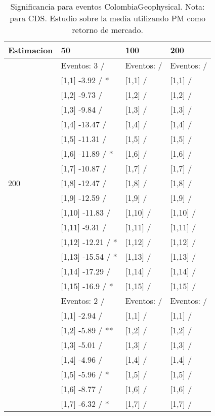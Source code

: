\begin{table}

\caption{Significancia para eventos ColombiaGeophysical. Nota: para CDS. Estudio sobre la media utilizando PM como retorno de mercado.}
\centering
\begin{tabular}[t]{llll}
\toprule
Estimacion & 50 & 100 & 200\\
\midrule
 & Eventos:  3 / & Eventos:   / & Eventos:   /\\
 & {}[1,1] -3.92  / * & {}[1,1]  / & {}[1,1]  /\\
 & {}[1,2] -9.73  / & {}[1,2]  / & {}[1,2]  /\\
 & {}[1,3] -9.84  / & {}[1,3]  / & {}[1,3]  /\\
 & {}[1,4] -13.47  / & {}[1,4]  / & {}[1,4]  /\\
\addlinespace
 & {}[1,5] -11.31  / & {}[1,5]  / & {}[1,5]  /\\
 & {}[1,6] -11.89  / * & {}[1,6]  / & {}[1,6]  /\\
 & {}[1,7] -10.87  / & {}[1,7]  / & {}[1,7]  /\\
200 & {}[1,8] -12.47  / & {}[1,8]  / & {}[1,8]  /\\
 & {}[1,9] -12.59  / & {}[1,9]  / & {}[1,9]  /\\
\addlinespace
 & {}[1,10] -11.83  / & {}[1,10]  / & {}[1,10]  /\\
 & {}[1,11] -9.31  / & {}[1,11]  / & {}[1,11]  /\\
 & {}[1,12] -12.21  / * & {}[1,12]  / & {}[1,12]  /\\
 & {}[1,13] -15.54  / * & {}[1,13]  / & {}[1,13]  /\\
 & {}[1,14] -17.29  / & {}[1,14]  / & {}[1,14]  /\\
\addlinespace
 & {}[1,15] -16.9  / * & {}[1,15]  / & {}[1,15]  /\\
 & Eventos:  2 / & Eventos:   / & Eventos:   /\\
 & {}[1,1] -2.94  / & {}[1,1]  / & {}[1,1]  /\\
 & {}[1,2] -5.89  / ** & {}[1,2]  / & {}[1,2]  /\\
 & {}[1,3] -5.01  / & {}[1,3]  / & {}[1,3]  /\\
\addlinespace
 & {}[1,4] -4.96  / & {}[1,4]  / & {}[1,4]  /\\
 & {}[1,5] -5.96  / * & {}[1,5]  / & {}[1,5]  /\\
 & {}[1,6] -8.77  / & {}[1,6]  / & {}[1,6]  /\\
 & {}[1,7] -6.32  / * & {}[1,7]  / & {}[1,7]  /\\

\end{tabular}
\end{table}
